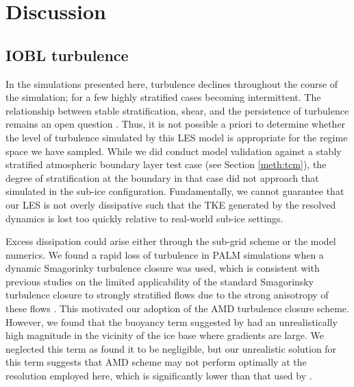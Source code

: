 \documentclass[draft]{agujournal2019}
\begin{document}
\section{Discussion}\label{disc}

\subsection{IOBL turbulence} \label{disc:dyn}

In the simulations presented here, turbulence declines throughout the course of the simulation; for a few highly stratified cases becoming intermittent. The relationship between stable stratification, shear, and the persistence of turbulence remains an open question \cite{zonta_stably_2018}. Thus, it is not possible a priori to determine whether the level of turbulence simulated by this LES model is appropriate for the regime space we have sampled. While we did conduct model validation against a stably stratified atmospheric boundary layer test case (see Section \ref{meth:tcm}), the degree of stratification at the boundary in that case did not approach that simulated in the sub-ice configuration. Fundamentally, we cannot guarantee that our LES is not overly dissipative such that the TKE generated by the resolved dynamics is lost too quickly relative to real-world sub-ice settings. 

Excess dissipation could arise either through the sub-grid scheme or the model numerics. We found a rapid loss of turbulence in PALM simulations when a dynamic Smagorinky turbulence closure was used, which is consistent with previous studies on the limited applicability of the standard Smagorinsky turbulence closure to strongly stratified flows due to the strong anisotropy of these flows \cite{flores_analysis_2011, jimenez_large-eddy_2005}. This motivated our adoption of the AMD turbulence closure scheme. However, we found that the buoyancy term suggested by  had an unrealistically high magnitude in the vicinity of the ice base where gradients are large. We neglected this term as  found it to be negligible, but our unrealistic solution for this term suggests that AMD scheme may not perform optimally at the resolution employed here, which is significantly lower than that used by . 
\end{document}
